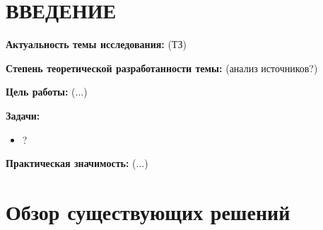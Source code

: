 \documentclass[a4paper,14pt]{extarticle}
\begin{document}
\tableofcontents
\newpage

\section*{ВВЕДЕНИЕ}

\textbf{Актуальность темы исследования:} (ТЗ)

\textbf{Степень теоретической разработанности темы:} (анализ источников?)

\textbf{Цель работы:} (...)

\textbf{Задачи:}
\begin{itemize}
\item ?
\end{itemize}

\textbf{Практическая значимость:} (...)

\section{Обзор существующих решений}
\end{document}

